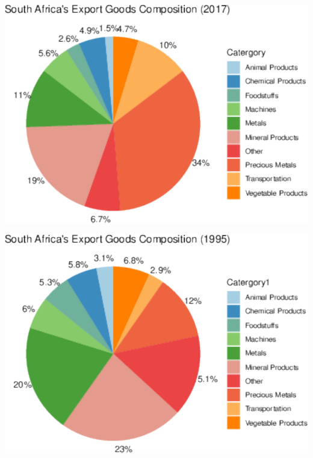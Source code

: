 \documentclass[11pt,preprint, authoryear]{elsarticle}
\let\origfigure\figure
\let\endorigfigure\endfigure
\renewenvironment{figure}[1][2] {
    \expandafter\origfigure\expandafter[H]
} {
    \endorigfigure
}
\numberwithin{equation}{section}
\numberwithin{figure}{section}
\numberwithin{table}{section}
\begin{document}
\begin{figure}[H]

{\centering \includegraphics{tradedynamics1_files/figure-latex/Graph3-1} 

}

\caption{South Africa Export Composition 2017 \label{Graph3}}\label{fig:Graph3}
\end{figure}
\begin{figure}[H]

{\centering \includegraphics{tradedynamics1_files/figure-latex/Graph4-1} 

}

\caption{South Africa Export Composition 1995 \label{Graph4}}\label{fig:Graph4}
\end{figure}
\end{document}
